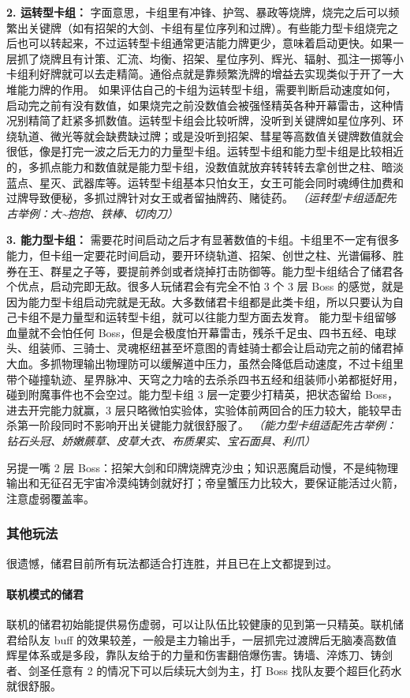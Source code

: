 \documentclass[12pt, a4paper]{article}
\begin{document}
\textbf{2. 运转型卡组：}
字面意思，卡组里有冲锋、护驾、暴政等烧牌，烧完之后可以频繁出关键牌（如有招架的大剑、卡组有星位序列和过牌）。有些能力型卡组烧完之后也可以转起来，不过运转型卡组通常更洁能力牌更少，意味着启动更快。如果一层抓了烧牌且有计策、汇流、均衡、招架、星位序列、辉光、辐射、孤注一掷等小卡组利好牌就可以去走精简。通俗点就是靠频繁洗牌的增益去实现类似于开了一大堆能力牌的作用。
如果评估自己的卡组为运转型卡组，需要判断启动速度如何，启动完之前有没有数值，如果烧完之前没数值会被强怪精英各种开幕雷击，这种情况别精简了赶紧多抓数值。运转型卡组会比较听牌，没听到关键牌如星位序列、环绕轨道、微光等就会缺费缺过牌；或是没听到招架、彗星等高数值关键牌数值就会很低，像是打完一波之后无力的力量型卡组。运转型卡组和能力型卡组是比较相近的，多抓点能力和数值就是能力型卡组，没数值就放弃转转转去拿创世之柱、暗淡蓝点、星灭、武器库等。运转型卡组基本只怕女王，女王可能会同时魂缚住加费和过牌导致便秘，多抓过牌针对女王或者留抽牌药、赌徒药。
\textit{（运转型卡组适配先古举例：大\textasciitilde 抱抱、铁棒、切肉刀）}

\textbf{3. 能力型卡组：}
需要花时间启动之后才有显著数值的卡组。卡组里不一定有很多能力，但卡组一定要花时间启动，要开环绕轨道、招架、创世之柱、光谱偏移、胜券在王、群星之子等，要提前养剑或者烧掉打击防御等。能力型卡组结合了储君各个优点，启动完即无敌。很多人玩储君会有完全不怕 3 个 3 层 Boss 的感觉，就是因为能力型卡组启动完就是无敌。大多数储君卡组都是此类卡组，所以只要认为自己卡组不是力量型和运转型卡组，就可以往能力型方面去发育。
能力型卡组留够血量就不会怕任何 Boss，但是会极度怕开幕雷击，残杀千足虫、四书五经、电球头、组装师、三骑士、灵魂枢纽甚至坏意图的青蛙骑士都会让启动完之前的储君掉大血。多抓物理输出物理防可以缓解道中压力，虽然会降低启动速度，不过卡组里带个碰撞轨迹、星界脉冲、天穹之力啥的去杀杀四书五经和组装师小弟都挺好用，碰到附魔事件也不会空过。能力型卡组 3 层一定要少打精英，把状态留给 Boss，进去开完能力就赢，3 层只略微怕实验体，实验体前两回合的压力较大，能较早击杀第一阶段同时不影响开出关键能力就很舒服了。
\textit{（能力型卡组适配先古举例：钻石头冠、娇嫩蕨草、皮草大衣、布质果实、宝石面具、利爪）}

另提一嘴 2 层 Boss：招架大剑和印牌烧牌克沙虫；知识恶魔启动慢，不是纯物理输出和无征召无宇宙冷漠纯铸剑就好打；帝皇蟹压力比较大，要保证能活过火箭，注意虚弱覆盖率。

\subsubsection{其他玩法}
很遗憾，储君目前所有玩法都适合打连胜，并且已在上文都提到过。

\paragraph{联机模式的储君}
联机的储君初始能提供易伤虚弱，可以让队伍比较健康的见到第一只精英。联机储君给队友 buff 的效果较差，一般是主力输出手，一层抓完过渡牌后无脑凑高数值辉星体系或是多段，靠队友给于的力量和伤害翻倍爆伤害。铸墙、淬炼刀、铸剑者、剑圣任意有 2 的情况下可以后续玩大剑为主，打 Boss 找队友要个超巨化药水就很舒服。
\end{document}

